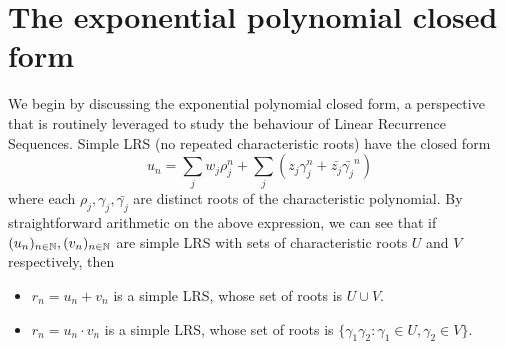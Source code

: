 \section{The exponential polynomial closed form}
\label{section:solspace}
We begin by discussing the exponential polynomial closed form, a perspective that is routinely leveraged to study the behaviour of Linear Recurrence Sequences. Simple LRS (no repeated characteristic roots) have the closed form
\begin{equation}
\label{eq:exppoly}
u_n = \sum_j w_j \rho_j^n + \sum_j (z_j \gamma_j^n + \bar{z_j}\bar{\gamma_j}^n)
\end{equation}
where each $\rho_j, \gamma_j, \bar{\gamma_j}$ are distinct roots of the characteristic polynomial. By straightforward arithmetic on the above expression, we can see that if $(u_n)_{n\in \mathbb{N}}, (v_n)_{n\in \mathbb{N}}$ are simple LRS with sets of characteristic roots $U$ and $V$ respectively, then
\begin{itemize}
\item $r_n = u_n + v_n$ is a simple LRS, whose set of roots is $U \cup V$.
\item $r_n = u_n \cdot v_n$ is a simple LRS, whose set of roots is $\{\gamma_1\gamma_2: \gamma_1 \in U, \gamma_2 \in V\}$.
\end{itemize}


